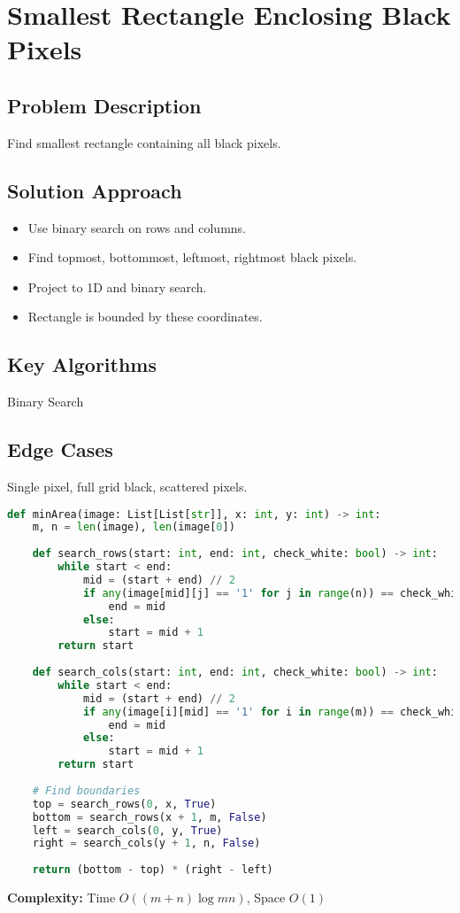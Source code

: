 \documentclass[10pt, a4paper]{article}
\begin{document}
\section{Smallest Rectangle Enclosing Black Pixels}
\subsection*{Problem Description}
Find smallest rectangle containing all black pixels.

\subsection*{Solution Approach}
\begin{itemize}
    \item Use binary search on rows and columns.
    \item Find topmost, bottommost, leftmost, rightmost black pixels.
    \item Project to 1D and binary search.
    \item Rectangle is bounded by these coordinates.
\end{itemize}

\subsection*{Key Algorithms}
Binary Search

\subsection*{Edge Cases}
Single pixel, full grid black, scattered pixels.

\begin{lstlisting}[language=Python]
def minArea(image: List[List[str]], x: int, y: int) -> int:
    m, n = len(image), len(image[0])
    
    def search_rows(start: int, end: int, check_white: bool) -> int:
        while start < end:
            mid = (start + end) // 2
            if any(image[mid][j] == '1' for j in range(n)) == check_white:
                end = mid
            else:
                start = mid + 1
        return start
    
    def search_cols(start: int, end: int, check_white: bool) -> int:
        while start < end:
            mid = (start + end) // 2
            if any(image[i][mid] == '1' for i in range(m)) == check_white:
                end = mid
            else:
                start = mid + 1
        return start
    
    # Find boundaries
    top = search_rows(0, x, True)
    bottom = search_rows(x + 1, m, False)
    left = search_cols(0, y, True)
    right = search_cols(y + 1, n, False)
    
    return (bottom - top) * (right - left)
\end{lstlisting}
\textbf{Complexity:} Time $O((m+n) \log mn)$, Space $O(1)$
\end{document}
